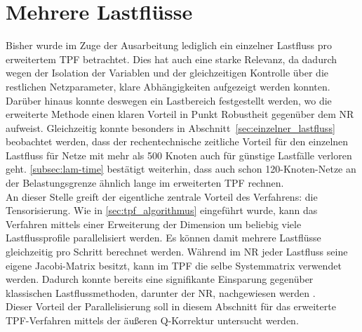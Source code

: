 \section{Mehrere Lastflüsse}
\label{sec:batch_lastfluss}


Bisher wurde im Zuge der Ausarbeitung lediglich ein einzelner Lastfluss pro erweitertem TPF betrachtet.
Dies hat auch eine starke Relevanz, da dadurch wegen der Isolation der Variablen und der gleichzeitigen Kontrolle über die restlichen Netzparameter, klare Abhängigkeiten aufgezeigt werden konnten.
Darüber hinaus konnte deswegen ein Lastbereich festgestellt werden, wo die erweiterte Methode einen klaren Vorteil in Punkt Robustheit gegenüber dem NR aufweist.
Gleichzeitig konnte besonders in Abschnitt~\ref{sec:einzelner_lastfluss} beobachtet werden, dass der rechentechnische zeitliche Vorteil für den einzelnen Lastfluss für Netze mit mehr als 500 Knoten auch für günstige Lastfälle verloren geht.
\cref{subsec:lam-time} bestätigt weiterhin, dass auch schon 120-Knoten-Netze an der Belastungsgrenze ähnlich lange im erweiterten TPF rechnen.\\

An dieser Stelle greift der eigentliche zentrale Vorteil des Verfahrens: die Tensorisierung.
Wie in \cref{sec:tpf_algorithmus} eingeführt wurde, kann das Verfahren mittels einer Erweiterung der Dimension um beliebig viele Lastflussprofile parallelisiert werden.
Es können damit mehrere Lastflüsse gleichzeitig pro Schritt berechnet werden.
Während im NR jeder Lastfluss seine eigene Jacobi-Matrix besitzt, kann im TPF die selbe Systemmatrix verwendet werden.
Dadurch konnte bereits eine signifikante Einsparung gegenüber klassischen Lastflussmethoden, darunter der NR, nachgewiesen werden \cite{Salazar2024}.\\

Dieser Vorteil der Parallelisierung soll in diesem Abschnitt für das erweiterte TPF-Verfahren mittels der äußeren Q-Korrektur untersucht werden.\\








